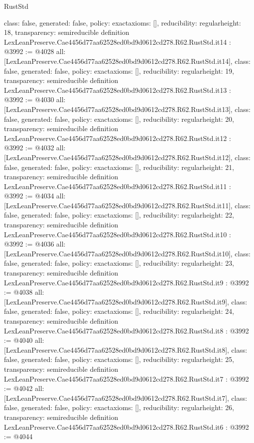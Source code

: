 \begin{lexlean}{RustStd}
\begin{coremodule}
{  class: false,
  generated: false,
  policy: exact{axioms: []},
  reducibility: regular{height: 18},
  transparency: semireducible
}
definition LexLeanPreserve.Cae4456d77aa62528ed0bd9d0612cd278.R62.RustStd.it14 : @3992 := @4028 {
  all: [LexLeanPreserve.Cae4456d77aa62528ed0bd9d0612cd278.R62.RustStd.it14],
  class: false,
  generated: false,
  policy: exact{axioms: []},
  reducibility: regular{height: 19},
  transparency: semireducible
}
definition LexLeanPreserve.Cae4456d77aa62528ed0bd9d0612cd278.R62.RustStd.it13 : @3992 := @4030 {
  all: [LexLeanPreserve.Cae4456d77aa62528ed0bd9d0612cd278.R62.RustStd.it13],
  class: false,
  generated: false,
  policy: exact{axioms: []},
  reducibility: regular{height: 20},
  transparency: semireducible
}
definition LexLeanPreserve.Cae4456d77aa62528ed0bd9d0612cd278.R62.RustStd.it12 : @3992 := @4032 {
  all: [LexLeanPreserve.Cae4456d77aa62528ed0bd9d0612cd278.R62.RustStd.it12],
  class: false,
  generated: false,
  policy: exact{axioms: []},
  reducibility: regular{height: 21},
  transparency: semireducible
}
definition LexLeanPreserve.Cae4456d77aa62528ed0bd9d0612cd278.R62.RustStd.it11 : @3992 := @4034 {
  all: [LexLeanPreserve.Cae4456d77aa62528ed0bd9d0612cd278.R62.RustStd.it11],
  class: false,
  generated: false,
  policy: exact{axioms: []},
  reducibility: regular{height: 22},
  transparency: semireducible
}
definition LexLeanPreserve.Cae4456d77aa62528ed0bd9d0612cd278.R62.RustStd.it10 : @3992 := @4036 {
  all: [LexLeanPreserve.Cae4456d77aa62528ed0bd9d0612cd278.R62.RustStd.it10],
  class: false,
  generated: false,
  policy: exact{axioms: []},
  reducibility: regular{height: 23},
  transparency: semireducible
}
definition LexLeanPreserve.Cae4456d77aa62528ed0bd9d0612cd278.R62.RustStd.it9 : @3992 := @4038 {
  all: [LexLeanPreserve.Cae4456d77aa62528ed0bd9d0612cd278.R62.RustStd.it9],
  class: false,
  generated: false,
  policy: exact{axioms: []},
  reducibility: regular{height: 24},
  transparency: semireducible
}
definition LexLeanPreserve.Cae4456d77aa62528ed0bd9d0612cd278.R62.RustStd.it8 : @3992 := @4040 {
  all: [LexLeanPreserve.Cae4456d77aa62528ed0bd9d0612cd278.R62.RustStd.it8],
  class: false,
  generated: false,
  policy: exact{axioms: []},
  reducibility: regular{height: 25},
  transparency: semireducible
}
definition LexLeanPreserve.Cae4456d77aa62528ed0bd9d0612cd278.R62.RustStd.it7 : @3992 := @4042 {
  all: [LexLeanPreserve.Cae4456d77aa62528ed0bd9d0612cd278.R62.RustStd.it7],
  class: false,
  generated: false,
  policy: exact{axioms: []},
  reducibility: regular{height: 26},
  transparency: semireducible
}
definition LexLeanPreserve.Cae4456d77aa62528ed0bd9d0612cd278.R62.RustStd.it6 : @3992 := @4044 {
}
\end{coremodule}
\end{lexlean}
